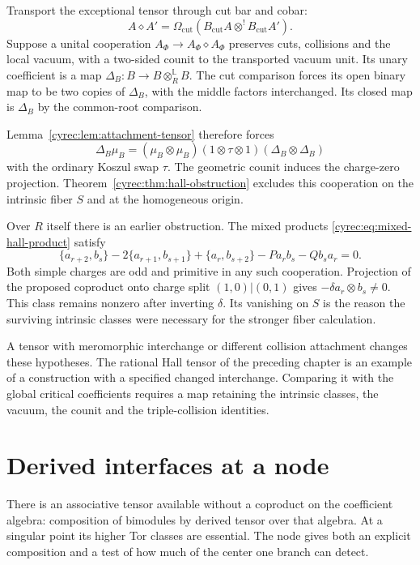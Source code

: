 Transport the exceptional tensor through cut bar and cobar:
\[
 A\diamond A'=\Omega_{\mathrm{cut}}
       (B_{\mathrm{cut}}A\otimes^!B_{\mathrm{cut}}A').
\]
Suppose a unital cooperation $A_\Phi\to A_\Phi\diamond A_\Phi$
preserves cuts, collisions and the local vacuum, with a two-sided
counit to the transported vacuum unit. Its unary coefficient is
a map $\Delta_B:B\to B\otimes_R^{\mathbb L}B$.
The cut comparison forces its open binary map to be two copies
of $\Delta_B$, with the middle factors interchanged. Its closed
map is $\Delta_B$ by the common-root comparison.

Lemma~\ref{cyrec:lem:attachment-tensor} therefore forces
\[
 \Delta_B\mu_B=(\mu_B\otimes\mu_B)
            (1\otimes\tau\otimes1)(\Delta_B\otimes\Delta_B)
\]
with the ordinary Koszul swap $\tau$. The geometric counit
induces the charge-zero projection.
Theorem~\ref{cyrec:thm:hall-obstruction} excludes this cooperation
on the intrinsic fiber $S$ and at the homogeneous origin.

Over $R$ itself there is an earlier obstruction. The mixed
products \eqref{cyrec:eq:mixed-hall-product} satisfy
\[
 \{a_{r+2},b_s\}-2\{a_{r+1},b_{s+1}\}
       +\{a_r,b_{s+2}\}-P a_rb_s-Q b_sa_r=0.
\]
Both simple charges are odd and primitive in any such cooperation.
Projection of the proposed coproduct onto charge split
$(1,0)|(0,1)$ gives $-\delta a_r\otimes b_s\ne0$.
This class remains nonzero after inverting $\delta$.
Its vanishing on $S$ is the reason the surviving intrinsic
classes were necessary for the stronger fiber calculation.

A tensor with meromorphic interchange or different collision
attachment changes these hypotheses. The rational Hall tensor
of the preceding chapter is an example of a construction with a
specified changed interchange. Comparing it with the global
critical coefficients requires a map retaining the intrinsic
classes, the vacuum, the counit and the triple-collision identities.

\section{Derived interfaces at a node}

There is an associative tensor available without a coproduct on
the coefficient algebra: composition of bimodules by derived
tensor over that algebra. At a singular point its higher Tor
classes are essential. The node gives both an explicit composition
and a test of how much of the center one branch can detect.

